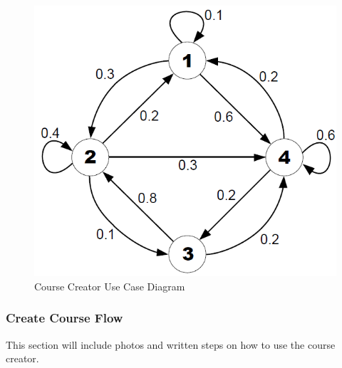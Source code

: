 \begin{figure}[htb]
	\centering
	\includegraphics[width=.5\textwidth]{Requirements/assets/course-use-case-diagram.png}
	\caption[Course Creator Use Case Diagram]{\label{Course Creator Use Case Diagram}Course Creator Use Case Diagram}
\end{figure}

\subsubsection{Create Course Flow}
This section will include photos and written steps on how to use the course creator. 

